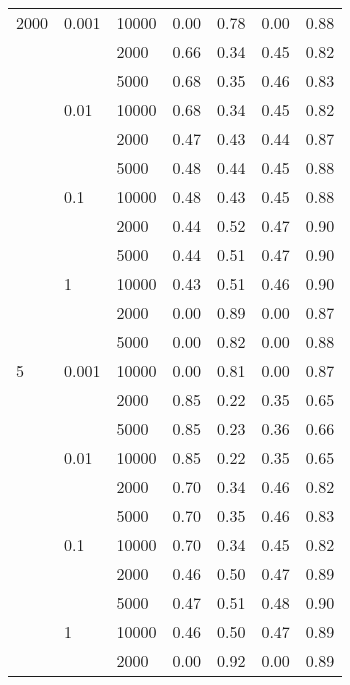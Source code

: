 \begin{tabular}{lllrrrr}
2000 & 0.001 & 10000 &       0.00 &       0.78 &       0.00 &       0.88 \\
      &       & 2000 &       0.66 &       0.34 &       0.45 &       0.82 \\
      &       & 5000 &       0.68 &       0.35 &       0.46 &       0.83 \\
      & 0.01 & 10000 &       0.68 &       0.34 &       0.45 &       0.82 \\
      &       & 2000 &       0.47 &       0.43 &       0.44 &       0.87 \\
      &       & 5000 &       0.48 &       0.44 &       0.45 &       0.88 \\
      & 0.1 & 10000 &       0.48 &       0.43 &       0.45 &       0.88 \\
      &       & 2000 &       0.44 &       0.52 &       0.47 &       0.90 \\
      &       & 5000 &       0.44 &       0.51 &       0.47 &       0.90 \\
      & 1 & 10000 &       0.43 &       0.51 &       0.46 &       0.90 \\
      &       & 2000 &       0.00 &       0.89 &       0.00 &       0.87 \\
      &       & 5000 &       0.00 &       0.82 &       0.00 &       0.88 \\
5 & 0.001 & 10000 &       0.00 &       0.81 &       0.00 &       0.87 \\
      &       & 2000 &       0.85 &       0.22 &       0.35 &       0.65 \\
      &       & 5000 &       0.85 &       0.23 &       0.36 &       0.66 \\
      & 0.01 & 10000 &       0.85 &       0.22 &       0.35 &       0.65 \\
      &       & 2000 &       0.70 &       0.34 &       0.46 &       0.82 \\
      &       & 5000 &       0.70 &       0.35 &       0.46 &       0.83 \\
      & 0.1 & 10000 &       0.70 &       0.34 &       0.45 &       0.82 \\
      &       & 2000 &       0.46 &       0.50 &       0.47 &       0.89 \\
      &       & 5000 &       0.47 &       0.51 &       0.48 &       0.90 \\
      & 1 & 10000 &       0.46 &       0.50 &       0.47 &       0.89 \\
      &       & 2000 &       0.00 &       0.92 &       0.00 &       0.89 \\

\end{tabular}
